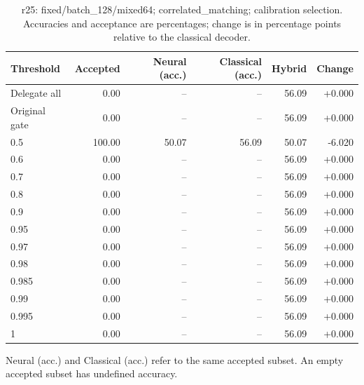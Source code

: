 \begin{table}[htbp]
\centering\small
\setlength{\tabcolsep}{3pt}
\caption{r25: fixed/batch\_128/mixed64; correlated\_matching; calibration selection. Accuracies and acceptance are percentages; change is in percentage points relative to the classical decoder.}
\begin{tabular}{lrrrrr}
\toprule
Threshold & Accepted & Neural (acc.) & Classical (acc.) & Hybrid & Change \\
\midrule
Delegate all & 0.00 & -- & -- & 56.09 & +0.000 \\
Original gate & 0.00 & -- & -- & 56.09 & +0.000 \\
0.5 & 100.00 & 50.07 & 56.09 & 50.07 & -6.020 \\
0.6 & 0.00 & -- & -- & 56.09 & +0.000 \\
0.7 & 0.00 & -- & -- & 56.09 & +0.000 \\
0.8 & 0.00 & -- & -- & 56.09 & +0.000 \\
0.9 & 0.00 & -- & -- & 56.09 & +0.000 \\
0.95 & 0.00 & -- & -- & 56.09 & +0.000 \\
0.97 & 0.00 & -- & -- & 56.09 & +0.000 \\
0.98 & 0.00 & -- & -- & 56.09 & +0.000 \\
0.985 & 0.00 & -- & -- & 56.09 & +0.000 \\
0.99 & 0.00 & -- & -- & 56.09 & +0.000 \\
0.995 & 0.00 & -- & -- & 56.09 & +0.000 \\
1 & 0.00 & -- & -- & 56.09 & +0.000 \\
\bottomrule
\end{tabular}
\par\smallskip\footnotesize Neural (acc.) and Classical (acc.) refer to the same accepted subset. An empty accepted subset has undefined accuracy.
\end{table}
